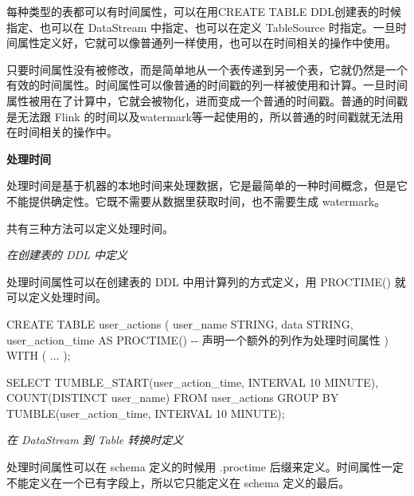 \documentclass[cn,11pt,chinese]{elegantbook}
\newenvironment{Shaded}{}{}
\newcommand{\DecValTok}[1]{\textcolor[rgb]{0.25,0.63,0.44}{#1}}
\newcommand{\FunctionTok}[1]{\textcolor[rgb]{0.02,0.16,0.49}{#1}}
\newcommand{\NormalTok}[1]{#1}
\begin{document}
每种类型的表都可以有时间属性，可以在用CREATE TABLE
DDL创建表的时候指定、也可以在 DataStream 中指定、也可以在定义
TableSource
时指定。一旦时间属性定义好，它就可以像普通列一样使用，也可以在时间相关的操作中使用。

只要时间属性没有被修改，而是简单地从一个表传递到另一个表，它就仍然是一个有效的时间属性。时间属性可以像普通的时间戳的列一样被使用和计算。一旦时间属性被用在了计算中，它就会被物化，进而变成一个普通的时间戳。普通的时间戳是无法跟
Flink
的时间以及watermark等一起使用的，所以普通的时间戳就无法用在时间相关的操作中。

\textbf{处理时间}

处理时间是基于机器的本地时间来处理数据，它是最简单的一种时间概念，但是它不能提供确定性。它既不需要从数据里获取时间，也不需要生成
watermark。

共有三种方法可以定义处理时间。

\emph{在创建表的 DDL 中定义}

处理时间属性可以在创建表的 DDL 中用计算列的方式定义，用 PROCTIME()
就可以定义处理时间。

\begin{Shaded}
\begin{Highlighting}[]
\NormalTok{CREATE TABLE }\FunctionTok{user\_actions}\NormalTok{ (}
\NormalTok{  user\_name STRING,}
\NormalTok{  data STRING,}
\NormalTok{  user\_action\_time AS }\FunctionTok{PROCTIME}\NormalTok{() {-}{-} 声明一个额外的列作为处理时间属性}
\NormalTok{) }\FunctionTok{WITH}\NormalTok{ (}
\NormalTok{  ...}
\NormalTok{);}

\NormalTok{SELECT }\FunctionTok{TUMBLE\_START}\NormalTok{(user\_action\_time, INTERVAL \textquotesingle{}}\DecValTok{10}\NormalTok{\textquotesingle{} MINUTE), }\FunctionTok{COUNT}\NormalTok{(DISTINCT user\_name)}
\NormalTok{FROM user\_actions}
\NormalTok{GROUP BY }\FunctionTok{TUMBLE}\NormalTok{(user\_action\_time, INTERVAL \textquotesingle{}}\DecValTok{10}\NormalTok{\textquotesingle{} MINUTE);}
\end{Highlighting}
\end{Shaded}

\emph{在 DataStream 到 Table 转换时定义}

处理时间属性可以在 schema 定义的时候用 .proctime
后缀来定义。时间属性一定不能定义在一个已有字段上，所以它只能定义在
schema 定义的最后。
\end{document}
